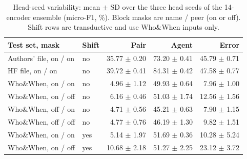\begin{table}[t]
\caption{Head-seed variability: mean $\pm$ SD over the three head seeds of the 14-encoder ensemble (micro-F1, \%). Block masks are name / peer (on or off). Shift rows are transductive and use Who\&When inputs only.}
\label{tab:seedsd}
\centering\footnotesize\setlength{\tabcolsep}{3pt}
\begin{tabular}{@{}llrrr@{}}
\toprule
Test set, mask & Shift & Pair & Agent & Error \\
\midrule
Authors' file, on / on & no & 35.77 $\pm$ 0.20 & 73.20 $\pm$ 0.41 & 45.79 $\pm$ 0.71 \\
HF file, on / on & no & 39.72 $\pm$ 0.41 & 84.31 $\pm$ 0.42 & 47.58 $\pm$ 0.77 \\
Who\&When, on / on & no & 4.96 $\pm$ 1.12 & 49.93 $\pm$ 0.64 & 7.96 $\pm$ 1.00 \\
Who\&When, on / off & no & 6.16 $\pm$ 0.46 & 51.03 $\pm$ 1.74 & 12.56 $\pm$ 1.56 \\
Who\&When, off / on & no & 4.71 $\pm$ 0.56 & 45.21 $\pm$ 0.63 & 7.90 $\pm$ 1.15 \\
Who\&When, off / off & no & 4.77 $\pm$ 0.76 & 46.19 $\pm$ 1.30 & 9.82 $\pm$ 1.51 \\
Who\&When, on / on & yes & 5.14 $\pm$ 1.97 & 51.69 $\pm$ 0.36 & 10.28 $\pm$ 5.24 \\
Who\&When, on / off & yes & 10.68 $\pm$ 2.18 & 51.27 $\pm$ 2.25 & 23.12 $\pm$ 3.72 \\
\bottomrule
\end{tabular}
\end{table}
